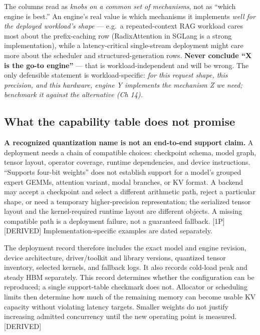 The columns read as \emph{knobs on a common set of mechanisms}, not as
``which engine is best.'' An engine's real value is which mechanisms it
implements \emph{well for the deployed workload's shape} --- e.g.~a
repeated-context RAG workload cares most about the prefix-caching row
(RadixAttention in SGLang is a strong implementation), while a
latency-critical single-stream deployment might care more about the
scheduler and structured-generation rows. \textbf{Never conclude ``X is
the go-to engine''} --- that is workload-independent and will be wrong.
The only defensible statement is workload-specific: \emph{for this
request shape, this precision, and this hardware, engine Y implements
the mechanism Z we need; benchmark it against the alternative (Ch 14).}

\subsection{What the capability table does not
promise}\label{what-the-capability-table-does-not-promise}

\textbf{A recognized quantization name is not an end-to-end support
claim.} A deployment needs a chain of compatible choices: checkpoint
schema, model graph, tensor layout, operator coverage, runtime
dependencies, and device instructions. ``Supports four-bit weights''
does not establish support for a model's grouped expert GEMMs, attention
variant, modal branches, or KV format. A backend may accept a checkpoint
and select a different arithmetic path, reject a particular shape, or
need a temporary higher-precision representation; the serialized tensor
layout and the kernel-required runtime layout are different objects. A
missing compatible path is a deployment failure, not a guaranteed
fallback. \mbox{{[}1P{]}}\hspace{0pt}\mbox{{[}DERIVED{]}} Implementation-specific examples are
dated separately.

The deployment record therefore includes the exact model and engine
revision, device architecture, driver/toolkit and library versions,
quantized tensor inventory, selected kernels, and fallback logs. It also
records cold-load peak and steady HBM separately. This record determines
whether the configuration can be reproduced; a single support-table
checkmark does not. Allocator or scheduling limits then determine how
much of the remaining memory can become usable KV capacity without
violating latency targets. Smaller weights do not justify increasing
admitted concurrency until the new operating point is measured.
\mbox{{[}DERIVED{]}}

